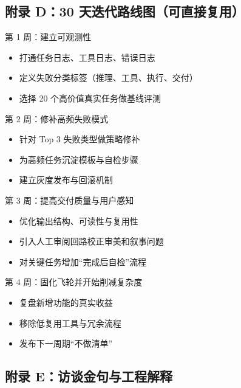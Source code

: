 \documentclass[a4paper]{article}
\begin{document}
\subsection{附录 D：30 天迭代路线图（可直接复用）}

\begin{knowledgebox}{第 1 周：建立可观测性}
\begin{itemize}
    \item 打通任务日志、工具日志、错误日志
    \item 定义失败分类标签（推理、工具、执行、交付）
    \item 选择 20 个高价值真实任务做基线评测
\end{itemize}
\end{knowledgebox}

\begin{knowledgebox}{第 2 周：修补高频失败模式}
\begin{itemize}
    \item 针对 Top 3 失败类型做策略修补
    \item 为高频任务沉淀模板与自检步骤
    \item 建立灰度发布与回滚机制
\end{itemize}
\end{knowledgebox}

\begin{knowledgebox}{第 3 周：提高交付质量与用户感知}
\begin{itemize}
    \item 优化输出结构、可读性与复用性
    \item 引入人工审阅回路校正审美和叙事问题
    \item 对关键任务增加“完成后自检”流程
\end{itemize}
\end{knowledgebox}

\begin{knowledgebox}{第 4 周：固化飞轮并开始削减复杂度}
\begin{itemize}
    \item 复盘新增功能的真实收益
    \item 移除低复用工具与冗余流程
    \item 发布下一周期“不做清单”
\end{itemize}
\end{knowledgebox}

\subsection{附录 E：访谈金句与工程解释}
\end{document}
